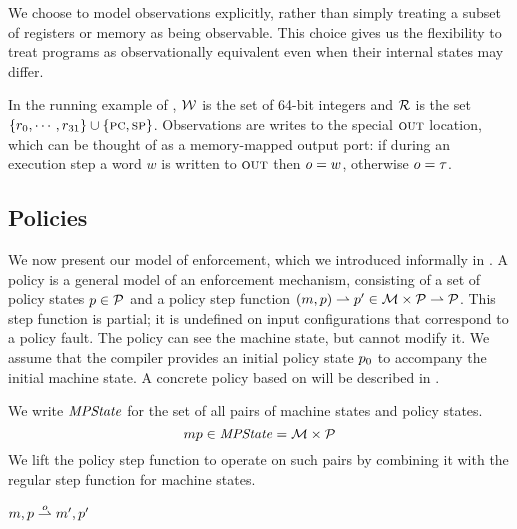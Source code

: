 \documentclass[acmsmall,review,anonymous]{acmart}\settopmatter{printfolios=true,printccs=false,printacmref=false}
\begin{document}
We choose to model observations explicitly, rather than simply treating
a subset of registers or memory as being observable.  This choice gives
us the flexibility to treat programs as observationally equivalent even when
their internal states may differ.

In the running example of ,
$\WORDS$ is the
set of 64-bit integers and $\REGS$ is the set $\{r_0, \cdots, r_{31}\}
\cup \{\PCname,\SP\}$. Observations are writes to the
special $\rout$ location\ifaftersubmission{}\fi, which can be thought of as a memory-mapped
  output port: if during an execution step a word $w$ is
written to $\rout$ then $\obs = w$, otherwise $\obs = \tau$.

\subsection{Policies}

We now present our model of enforcement, which we introduced informally in .
A policy is a general model of an enforcement mechanism, consisting of a set of policy
states \(\pol \in \POLS\) and a policy step function \((\mach, \pol) \polstep \pol' \in
\MACHS \times \POLS \rightharpoonup \POLS\). This step function is partial;
it is undefined on input configurations that correspond to a policy fault. The policy
can see the machine state, but cannot modify it. We assume that the
compiler provides an initial policy state \(\pol_0\) to accompany the initial machine state.
%
A concrete policy based on \citet{DBLP:conf/sp/RoesslerD18} will be described in
.

We write $\MPS$ for the set of all pairs of machine states and policy
states.
%
\[\mpstatename \in \MPS = \MACHS \times \POLS\]
%
We lift the policy step function to operate on such pairs
by combining it with the regular step function for machine states.

            {\(\mpstate{\mach}{\pol} \stepstopol[\obs]
               \mpstate{\mach'}{\pol'}\)}
\end{document}
